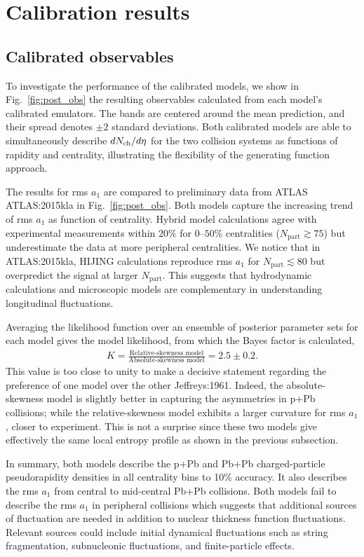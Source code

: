 \section{Calibration results}
\subsection{Calibrated observables}
To investigate the performance of the calibrated models, we show in Fig.~\ref{fig:post_obs} the resulting observables calculated from each model's calibrated emulators.
The bands are centered around the mean prediction, and their spread denotes $\pm 2$ standard deviations.
Both calibrated models are able to simultaneously describe $dN_\text{ch}/d\eta$ for the two collision systems as functions of rapidity and centrality, illustrating the flexibility of the generating function approach.

The results for rms $a_1$ are compared to preliminary data from ATLAS {ATLAS:2015kla} in Fig.~\ref{fig:post_obs}.
Both models capture the increasing trend of rms $a_1$ as function of centrality.
Hybrid model calculations agree with experimental measurements within $20\%$ for $0$--$50\%$ centralities ($N_{\textrm{part}} \gtrsim 75$) but underestimate the data at more peripheral centralities.
We notice that in {ATLAS:2015kla}, \mbox{HIJING} calculations reproduce rms $a_1$ for $N_{\textrm{part}} \lesssim 80$ but overpredict the signal at larger $N_{\textrm{part}}$.
This suggests that hydrodynamic calculations and microscopic models are complementary in understanding longitudinal fluctuations.

Averaging the likelihood function over an ensemble of posterior parameter sets for each model gives the model likelihood, from which the Bayes factor is calculated,
\begin{eqnarray}
K = \frac{\text{Relative-skewness model}}{\text{Absolute-skewness model}} = 2.5 \pm 0.2. 
\end{eqnarray}
This value is too close to unity to make a decisive statement regarding the preference of one model over the other {Jeffreys:1961}.
Indeed, the absolute-skewness model is slightly better in capturing the asymmetries in p+Pb collisions; while the relative-skewness model exhibits a larger curvature for rms $a_1$, closer to experiment.
This is not a surprise since these two models give effectively the same local entropy profile as shown in the previous subsection.

In summary, both models describe the p+Pb and Pb+Pb charged-particle pseudorapidity densities in all centrality bins to 10\% accuracy.
It also describes the rms $a_1$ from central to mid-central Pb+Pb collisions.
Both models fail to describe the rms $a_1$ in peripheral collisions which suggests that additional sources of fluctuation are needed in addition to nuclear thickness function fluctuations.
Relevant sources could include initial dynamical fluctuations such as string fragmentation, subnucleonic fluctuations, and finite-particle effects.


